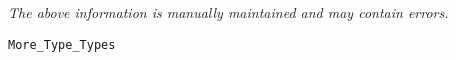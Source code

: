 \label{pkg:more\_type\_types}

{\tiny \it The above information is manually maintained and may contain errors.}
\begin{verbatim}
More_Type_Types
\end{verbatim}
